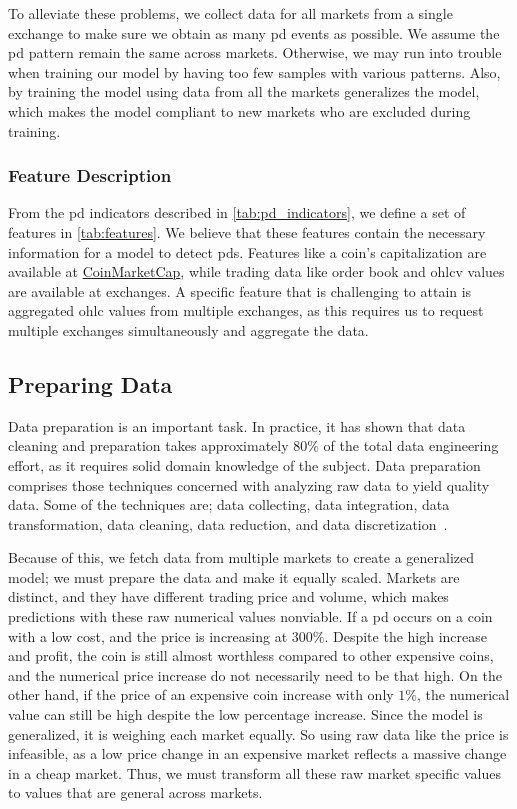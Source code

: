 To alleviate these problems, we collect data for all markets from a single exchange to make sure we obtain as many \ac{pd} events as possible. We assume the \ac{pd} pattern remain the same across markets. Otherwise, we may run into trouble when training our model by having too few samples with various patterns. Also, by training the model using data from all the markets generalizes the model, which makes the model compliant to new markets who are excluded during training.

\subsubsection{Feature Description}
From the \ac{pd} indicators described in \autoref{tab:pd_indicators}, we define a set of features in \autoref{tab:features}. We believe that these features contain the necessary information for a model to detect \acp{pd}. Features like a coin's capitalization are available at \href{https://coinmarketcap.com/}{CoinMarketCap}, while trading data like order book and \ac{ohlcv} values are available at exchanges. A specific feature that is challenging to attain is aggregated \ac{ohlc} values from multiple exchanges, as this requires us to request multiple exchanges simultaneously and aggregate the data.



\subsection{Preparing Data}\label{sec:prep}
Data preparation is an important task. In practice, it has shown that data cleaning and preparation takes approximately $80\%$ of the total data engineering effort, as it requires solid domain knowledge of the subject. Data preparation comprises those techniques concerned with analyzing raw data to yield quality data. Some of the techniques are; data collecting, data integration, data transformation, data cleaning, data reduction, and data discretization~\cite{zhang2003data}.

Because of this, we fetch data from multiple markets to create a generalized model; we must prepare the data and make it equally scaled. Markets are distinct, and they have different trading price and volume, which makes predictions with these raw numerical values nonviable. If a \ac{pd} occurs on a coin with a low cost, and the price is increasing at $300\%$. Despite the high increase and profit, the coin is still almost worthless compared to other expensive coins, and the numerical price increase do not necessarily need to be that high. On the other hand, if the price of an expensive coin increase with only $1\%$, the numerical value can still be high despite the low percentage increase. Since the model is generalized, it is weighing each market equally. So using raw data like the price is infeasible, as a low price change in an expensive market reflects a massive change in a cheap market. Thus, we must transform all these raw market specific values to values that are general across markets.

